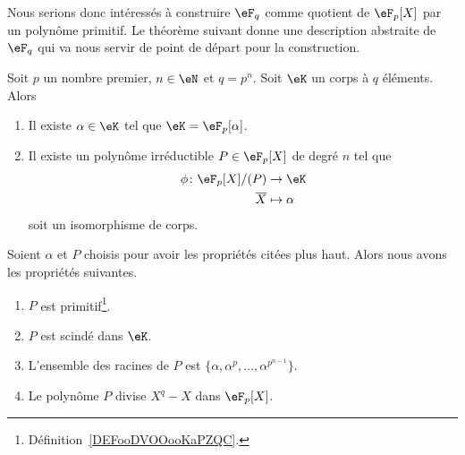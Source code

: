 Nous serions donc intéressés à construire \( \eF_{q}\) comme quotient de \( \eF_p[X]\) par un polynôme primitif. Le théorème suivant donne une description abstraite de \( \eF_q\) qui va nous servir de point de départ pour la construction.
\begin{theorem}   \label{ThoqSludu}
	Soit \( p\) un nombre premier, \( n\in \eN\) et \( q=p^n\). Soit \( \eK\) un corps à \( q\) éléments. Alors
	\begin{enumerate}
		\item
		      Il existe \( \alpha\in \eK\) tel que \( \eK=\eF_p[\alpha]\).
		\item
		      Il existe un polynôme irréductible \( P\in\eF_p[X]\) de degré \( n\) tel que
		      \begin{equation}        \label{EqWlMhhm}
			      \begin{aligned}
				      \phi\colon \eF_p[X]/(P) & \to \eK        \\
				      \overline        X      & \mapsto \alpha
			      \end{aligned}
		      \end{equation}
		      soit un isomorphisme de corps.
	\end{enumerate}
	Soient \( \alpha\) et \( P\) choisis pour avoir les propriétés citées plus haut. Alors nous avons les propriétés suivantes.
	\begin{enumerate}
		\item
		      \( P\) est primitif\footnote{Définition~\ref{DEFooDVOOooKaPZQC}.}.
		\item
		      \( P\) est scindé dans \( \eK\).
		\item
		      L'ensemble des racines de \( P\) est \( \{ \alpha,\alpha^p,\ldots, \alpha^{p^{n-1}} \}\).
		\item
		      Le polynôme \( P\) divise \( X^q-X\) dans \( \eF_p[X]\).
	\end{enumerate}
\end{theorem}


